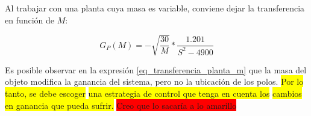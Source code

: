 \noindent Al trabajar con una planta cuya masa es variable, conviene dejar la transferencia en función de $M$:

\begin{equation} \label{eq_transferencia_planta_m}
		G_{P}(M)=-\sqrt{\frac{30}{M}}*\frac{1.201}{S^{2}-4900}
\end{equation}

\noindent Es posible observar en la expresión \ref{eq_transferencia_planta_m} que la masa del objeto modifica la ganancia del sistema, pero no la ubicación de los polos. \colorbox{yellow}{Por lo tanto, se debe escoger}
 \colorbox{yellow}{una estrategia de control que tenga en cuenta los}
 \colorbox{yellow}{ cambios en ganancia que pueda sufrir.}
 \colorbox{red}{Creo que lo sacaría a lo amarillo}

